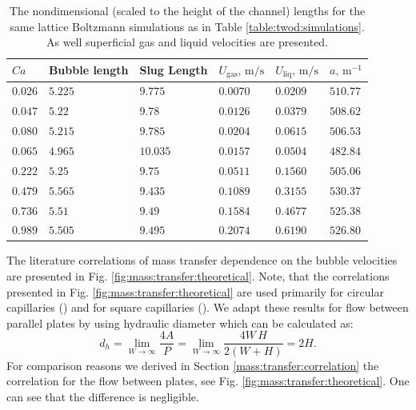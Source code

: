 \documentclass{article}
\begin{document}
\begin{table}
\begin{tabularx}{\textwidth}{|X|X|X|X|X|X|}
\hline
$Ca$&Bubble length& Slug Length&
$U_{\mathrm{gas}},\,\mathrm{m/s}$&$U_{\mathrm{liq}},\,\mathrm{m/s}$&$a,\,\mathrm{m^{-1}}$\\
\hline
$0.026$&$5.225$&$9.775$ &$0.0070$ &$0.0209$&$510.77$\\
$0.047$&$5.22$ &$9.78$  &$0.0126$ &$0.0379$&$508.62$\\
$0.080$&$5.215$&$9.785$ &$0.0204$ &$0.0615$&$506.53$\\
$0.065$&$4.965$&$10.035$&$0.0157$ &$0.0504$&$482.84$\\
$0.222$&$5.25$ &$9.75$  &$0.0511$ &$0.1560$&$505.06$\\
$0.479$&$5.565$&$9.435$ &$0.1089$ &$0.3155$&$530.37$\\
$0.736$&$5.51$ &$9.49$  &$0.1584$ &$0.4677$&$525.38$\\
$0.989$&$5.505$&$9.495$ &$0.2074$ &$0.6190$&$526.80$\\
\hline
\end{tabularx}
\caption{The nondimensional (scaled to the height of the channel) lengths for the same
lattice Boltzmann simulations as in Table \ref{table:twod:simulations}. As well superficial
gas and liquid velocities are presented. \label{table:lengths}} 
\end{table}

The literature correlations of mass transfer dependence on the bubble velocities are presented in
Fig. \ref{fig:mass:transfer:theoretical}. Note, that the correlations presented in
Fig. \ref{fig:mass:transfer:theoretical} are used primarily for circular capillaries
(\citeauthor{vanbaten-circular,bercic-mass}) and for square capillaries (\citeauthor{yue-mass}). We
adapt these results for flow between parallel plates by using hydraulic
diameter \cite{bercic-mass} which can be calculated as:
\begin{equation}
d_h = \lim_{W\to\infty}\frac{4A}{P}=\lim_{W\to\infty}\frac{4 W\,H}{2(W+H)}=2 H.
\end{equation}
For comparison reasons we derived in Section \ref{mass:transfer:correlation} the correlation for the
flow between plates, see Fig. \ref{fig:mass:transfer:theoretical}. One can see that the
difference is negligible.
\end{document}
